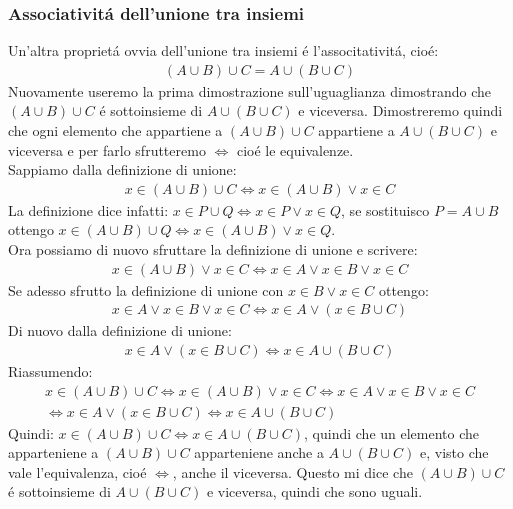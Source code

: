 \documentclass[twoside]{article} %
\begin{document}
		
		
		
		
	\newpage
	\subsubsection{Associativit\'a dell'unione tra insiemi}
	Un'altra propriet\'a ovvia dell'unione tra insiemi \'e l'associtativit\'a, cio\'e:
	\begin{gather*}
		(A\cup B)\cup C = A\cup (B\cup C)
	\end{gather*}	
	Nuovamente useremo la prima dimostrazione sull'uguaglianza dimostrando che $(A\cup B)\cup C$ \'e sottoinsieme di $A\cup (B\cup C)$ e viceversa. Dimostreremo quindi che ogni elemento che appartiene a $(A\cup B)\cup C$ appartiene a $A\cup (B\cup C)$ e viceversa e per farlo sfrutteremo $\Leftrightarrow$ cio\'e le equivalenze. \\
	Sappiamo dalla definizione di unione:
	\begin{gather*}
		x\in(A\cup B)\cup C\Leftrightarrow x\in (A\cup B)\vee x\in C
	\end{gather*}
	La definizione dice infatti: $x\in P\cup Q\Leftrightarrow x\in P\vee x\in Q$, se sostituisco $P=A\cup B$ ottengo $x\in (A\cup B)\cup Q\Leftrightarrow x\in (A\cup B)\vee x\in Q$. \\
	Ora possiamo di nuovo sfruttare la definizione di unione e scrivere:
	\begin{gather*}
		x\in (A\cup B)\vee x\in C\Leftrightarrow x\in A \vee x\in B \vee x\in C
	\end{gather*}
	Se adesso sfrutto la definizione di unione con $x\in B \vee x\in C$ ottengo:
	\begin{gather*}
		x\in A \vee x\in B \vee x\in C\Leftrightarrow x\in A\vee (x\in B\cup C)
	\end{gather*}
	Di nuovo dalla definizione di unione:
	\begin{gather*}
		x\in A\vee (x\in B\cup C)\Leftrightarrow x\in A\cup(B\cup C)
	\end{gather*}	
	Riassumendo:
	\begin{gather*}
		x\in(A\cup B)\cup C\Leftrightarrow x\in (A\cup B)\vee x\in C\Leftrightarrow x\in A \vee x\in B \vee x\in C\\\Leftrightarrow x\in A\vee (x\in B\cup C)\Leftrightarrow x\in A\cup(B\cup C)
	\end{gather*}
	Quindi: $x\in(A\cup B)\cup C\Leftrightarrow x\in A\cup(B\cup C)$, quindi che un elemento che apparteniene a $(A\cup B)\cup C$ apparteniene anche a $A\cup(B\cup C)$ e, visto che vale l'equivalenza, cio\'e $\Leftrightarrow$, anche il viceversa. Questo mi dice che $(A\cup B)\cup C$ \'e sottoinsieme di $A\cup(B\cup C)$ e viceversa, quindi che sono uguali.
	\newpage 
	
\end{document}
